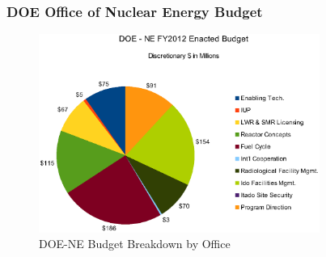 \begin{frame}[ctb!]
  \frametitle{DOE Office of Nuclear Energy Budget}
  \begin{figure}[htbp!]
    \begin{center}
      \includegraphics[height=6.5cm]{doe-ne.eps}
    \caption{DOE-NE Budget Breakdown by Office\cite{chu_2012}}
    \label{fig:doe-ne}
    \end{center}
  \end{figure}
\end{frame}
